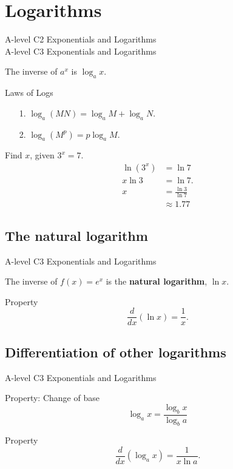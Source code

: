 \documentclass[11pt,a4paper,oneside]{book}
\begin{document}
\section{Logarithms}
\begin{gce}
A-level C2 Exponentials and Logarithms\\
A-level C3 Exponentials and Logarithms
\end{gce}
\begin{definition}
The inverse of $a^x$ is $\log_a x$.
\end{definition}

\begin{thing}{Laws of Logs}
\begin{itemize}
\item[1.] $\log_a(MN)=\log_aM + \log_aN$.
\item[2.] $\log_a(M^p)=p\log_aM$.
\end{itemize}
\end{thing}

\begin{example}
Find $x$, given $3^x=7$.
\begin{align*}
\ln(3^x)&=\ln7\\
x\ln 3&=\ln 7.\\
x&=\frac{\ln 3}{\ln 7}\\&\approx1.77
\end{align*}
\end{example}


\subsection{The natural logarithm}
\begin{gce}
A-level C3 Exponentials and Logarithms
\end{gce}
\begin{definition}
The inverse of $f(x)=e^x$ is the \textbf{natural logarithm}, $\ln x$.
\end{definition}

\begin{thing}{Property}
\[\frac{d}{dx}(\ln x)=\frac{1}{x}.\]
\end{thing}

\subsection{Differentiation of other logarithms}
\begin{gce}
A-level C3 Exponentials and Logarithms
\end{gce}
\begin{thing}{Property: Change of base}
\[\log_ax=\frac{\log_bx}{\log_ba}\]
\end{thing}
\begin{thing}{Property}
\[\frac{d}{dx}\left( \log_ax\right)=\frac{1}{x\ln a}.\]
\end{thing}
\end{document}
